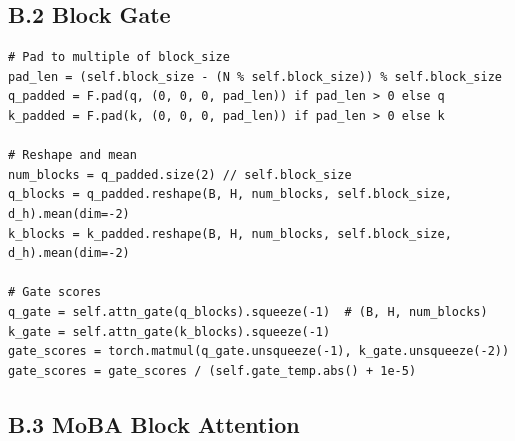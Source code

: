 \subsection{B.2 Block Gate}

\begin{lstlisting}
# Pad to multiple of block_size
pad_len = (self.block_size - (N % self.block_size)) % self.block_size
q_padded = F.pad(q, (0, 0, 0, pad_len)) if pad_len > 0 else q
k_padded = F.pad(k, (0, 0, 0, pad_len)) if pad_len > 0 else k

# Reshape and mean
num_blocks = q_padded.size(2) // self.block_size
q_blocks = q_padded.reshape(B, H, num_blocks, self.block_size, d_h).mean(dim=-2)
k_blocks = k_padded.reshape(B, H, num_blocks, self.block_size, d_h).mean(dim=-2)

# Gate scores
q_gate = self.attn_gate(q_blocks).squeeze(-1)  # (B, H, num_blocks)
k_gate = self.attn_gate(k_blocks).squeeze(-1)
gate_scores = torch.matmul(q_gate.unsqueeze(-1), k_gate.unsqueeze(-2))
gate_scores = gate_scores / (self.gate_temp.abs() + 1e-5)
\end{lstlisting}

\subsection{B.3 MoBA Block Attention}

